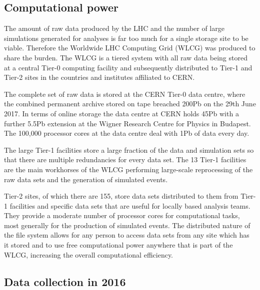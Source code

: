\subsection{Computational power} %
\label{sub:computational_power}

The amount of raw data produced by the LHC and the number of large simulations generated for analyses is far too much for a single storage site to be viable.
Therefore the Worldwide LHC Computing Grid (WLCG) was produced to share the burden.
The WLCG is a tiered system with all raw data being stored at a central Tier-0 computing facility and subsequently distributed to Tier-1 and Tier-2 sites in the countries and institutes affiliated to CERN.

The complete set of raw data is stored at the CERN Tier-0 data centre, where the combined permanent archive stored on tape breached 200\unit{Pb} on the 29th June 2017.
In terms of online storage the data centre at CERN holds 45\unit{Pb} with a further 5.5\unit{Pb} extension at the Wigner Research Centre for Physics in Budapest.
The 100,000 processor cores at the data centre deal with 1\unit{Pb} of data every day.

The large Tier-1 facilities store a large fraction of the data and simulation sets so that there are multiple redundancies for every data set.
The 13 Tier-1 facilities are the main workhorses of the WLCG performing large-scale reprocessing of the raw data sets and the generation of simulated events.

Tier-2 sites, of which there are 155, store data sets distributed to them from Tier-1 facilities and specific data sets that are useful for locally based analysis teams.
They provide a moderate number of processor cores for computational tasks, most generally for the production of simulated events.
The distributed nature of the file system allows for any person to access data sets from any site which has it stored and to use free computational power anywhere that is part of the WLCG, increasing the overall computational efficiency.


\subsection{Data collection in 2016} %
\label{sub:data_collection_in_2016}

